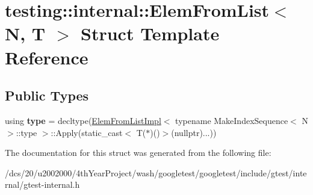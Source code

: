 \hypertarget{structtesting_1_1internal_1_1ElemFromList}{}\section{testing\+:\+:internal\+:\+:Elem\+From\+List$<$ N, T $>$ Struct Template Reference}
\label{structtesting_1_1internal_1_1ElemFromList}
\subsection*{Public Types}
\begin{DoxyCompactItemize}
\item 
\mbox{\label{structtesting_1_1internal_1_1ElemFromList_af1b6cfe1573b2474eb3aae384735f2fc}} 
using {\bfseries type} = decltype(\mbox{\hyperlink{structtesting_1_1internal_1_1ElemFromListImpl}{Elem\+From\+List\+Impl}}$<$ typename Make\+Index\+Sequence$<$ N $>$\+::type $>$\+::Apply(static\+\_\+cast$<$ T($\ast$)()$>$(nullptr)...))
\end{DoxyCompactItemize}


The documentation for this struct was generated from the following file\+:\begin{DoxyCompactItemize}
\item 
/dcs/20/u2002000/4th\+Year\+Project/wash/googletest/googletest/include/gtest/internal/gtest-\/internal.\+h\end{DoxyCompactItemize}
